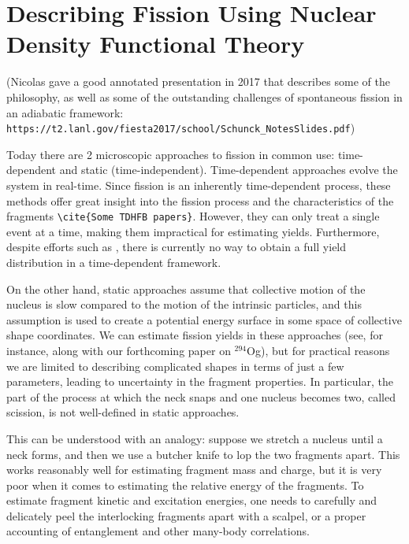 \chapter{Describing Fission Using Nuclear Density Functional Theory}\label{chap:Model}
\maketitle

(Nicolas gave a good annotated presentation in 2017 that describes some of the philosophy, as well as some of the outstanding challenges of spontaneous fission in an adiabatic framework: \verb|https://t2.lanl.gov/fiesta2017/school/Schunck_NotesSlides.pdf|)

Today there are 2 microscopic approaches to fission in common use: time-dependent and static (time-independent). Time-dependent approaches evolve the system in real-time. Since fission is an inherently time-dependent process, these methods offer great insight into the fission process and the characteristics of the fragments \verb|\cite{Some TDHFB papers}|. However, they can only treat a single event at a time, making them impractical for estimating yields. Furthermore, despite efforts such as \cite{Bulgac2018}, there is currently no way to obtain a full yield distribution in a time-dependent framework.

On the other hand, static approaches assume that collective motion of the nucleus is slow compared to the motion of the intrinsic particles, and this assumption is used to create a potential energy surface in some space of collective shape coordinates. We can estimate fission yields in these approaches (see, for instance, \cite{Sadhukhan2016} along with our forthcoming paper on $^{294}$Og), but for practical reasons we are limited to describing complicated shapes in terms of just a few parameters, leading to uncertainty in the fragment properties. In particular, the part of the process at which the neck snaps and one nucleus becomes two, called scission, is not well-defined in static approaches.

This can be understood with an analogy: suppose we stretch a nucleus until a neck forms, and then we use a butcher knife to lop the two fragments apart. This works reasonably well for estimating fragment mass and charge, but it is very poor when it comes to estimating the relative energy of the fragments. To estimate fragment kinetic and excitation energies, one needs to carefully and delicately peel the interlocking fragments apart with a scalpel, or a proper accounting of entanglement and other many-body correlations.

